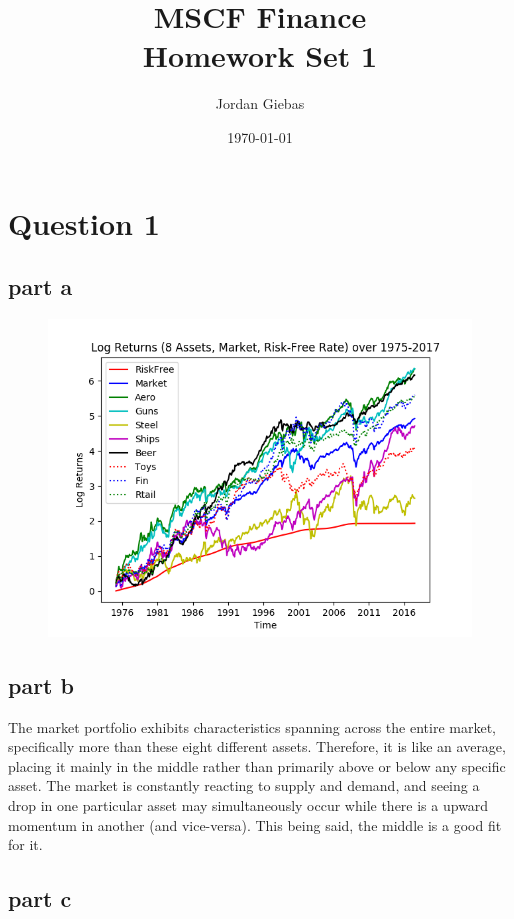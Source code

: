 \documentclass[12pt]{article}
\title{MSCF Finance\\ Homework Set 1}
\author{
Jordan Giebas
}
\date{\today}
\begin{document}
\maketitle

\section{Question 1}

	\subsection{part a}

		\begin{figure}[h]
		\centering
			\includegraphics[scale=0.75]{hw1_image1.png}
		\end{figure}

	\subsection{part b}
		
		The market portfolio exhibits characteristics spanning across the entire market, specifically more than these eight different assets. Therefore,
		it is like an average, placing it mainly in the middle rather than primarily above or below any specific asset. The market is constantly reacting to 
		supply and demand, and seeing a drop in one particular asset may simultaneously occur while there is a upward momentum in another (and vice-versa). 
		This being said, the middle is a good fit for it. 
		
	\subsection{part c}
	
\end{document}
